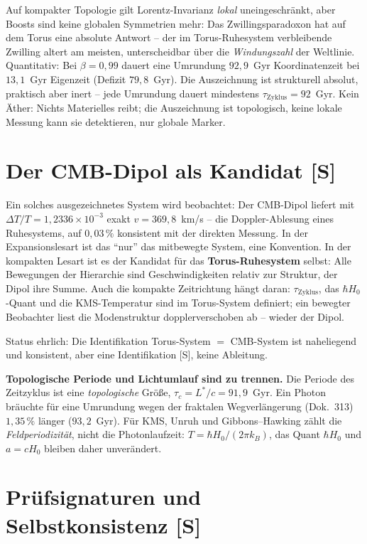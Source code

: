 Auf kompakter Topologie gilt Lorentz-Invarianz \emph{lokal}
uneingeschränkt, aber Boosts sind keine globalen Symmetrien mehr:
Das Zwillingsparadoxon hat auf dem Torus eine absolute Antwort --
der im Torus-Ruhesystem verbleibende Zwilling altert am meisten,
unterscheidbar über die \emph{Windungszahl} der Weltlinie.
Quantitativ: Bei $\beta = 0{,}99$ dauert eine Umrundung
$92{,}9$~Gyr Koordinatenzeit bei $13{,}1$~Gyr Eigenzeit
(Defizit $79{,}8$~Gyr). Die Auszeichnung ist strukturell absolut,
praktisch aber inert -- jede Umrundung dauert mindestens
$\tau_\text{Zyklus} = 92$~Gyr. Kein Äther: Nichts Materielles
reibt; die Auszeichnung ist topologisch, keine lokale Messung kann
sie detektieren, nur globale Marker.

\section{Der CMB-Dipol als Kandidat [S]}

Ein solches ausgezeichnetes System wird beobachtet: Der CMB-Dipol
liefert mit $\Delta T/T = 1{,}2336\times10^{-3}$ exakt
$v = 369{,}8$~km/s -- die Doppler-Ablesung eines Ruhesystems, auf
$0{,}03\,\%$ konsistent mit der direkten Messung. In der
Expansionslesart ist das \enquote{nur} das mitbewegte System, eine
Konvention. In der kompakten Lesart ist es der Kandidat für das
\textbf{Torus-Ruhesystem} selbst: Alle Bewegungen der Hierarchie
sind Geschwindigkeiten relativ zur Struktur, der Dipol ihre Summe.
Auch die kompakte Zeitrichtung hängt daran: $\tau_\text{Zyklus}$,
das $\hbar H_0$-Quant und die KMS-Temperatur sind im Torus-System
definiert; ein bewegter Beobachter liest die Modenstruktur
dopplerverschoben ab -- wieder der Dipol.

Status ehrlich: Die Identifikation Torus-System $=$ CMB-System ist
naheliegend und konsistent, aber eine Identifikation [S], keine
Ableitung.

\textbf{Topologische Periode und Lichtumlauf sind zu trennen.}
Die Periode des Zeitzyklus ist eine \emph{topologische} Größe,
$\tau_c = L^{*}/c = 91{,}9$~Gyr. Ein Photon bräuchte für eine
Umrundung wegen der fraktalen Wegverlängerung (Dok.~313)
$1{,}35\,\%$ länger ($93{,}2$~Gyr). Für KMS, Unruh und
Gibbons--Hawking zählt die \emph{Feldperiodizität}, nicht die
Photonlaufzeit: $T = \hbar H_0/(2\pi k_B)$, das Quant
$\hbar H_0$ und $a = cH_0$ bleiben daher unverändert.

\section{Prüfsignaturen und Selbstkonsistenz [S]}

